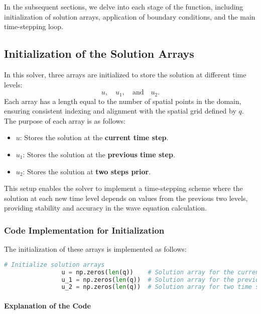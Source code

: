 \documentclass{article}
\begin{document}
		In the subsequent sections, we delve into each stage of the function, including initialization of solution arrays, application of boundary conditions, and the main time-stepping loop.
		
		
		\subsection{Initialization of the Solution Arrays}
		
			In this solver, three arrays are initialized to store the solution at different time levels:
			\[
			u, \quad u_1, \quad \text{and} \quad u_2.
			\]
			Each array has a length equal to the number of spatial points in the domain, ensuring consistent indexing and alignment with the spatial grid defined by \( q \). The purpose of each array is as follows:
			\begin{itemize}
				\item \( u \): Stores the solution at the \textbf{current time step}.
				\item \( u_1 \): Stores the solution at the \textbf{previous time step}.
				\item \( u_2 \): Stores the solution at \textbf{two steps prior}.
			\end{itemize}
			
			This setup enables the solver to implement a time-stepping scheme where the solution at each new time level depends on values from the previous two levels, providing stability and accuracy in the wave equation calculation.
			
			\subsubsection{Code Implementation for Initialization}
			
			The initialization of these arrays is implemented as follows:
			
			\begin{lstlisting}[language=Python]
				# Initialize solution arrays
				u = np.zeros(len(q))    # Solution array for the current time step
				u_1 = np.zeros(len(q))  # Solution array for the previous time step
				u_2 = np.zeros(len(q))  # Solution array for two time steps prior
			\end{lstlisting}
			
			\paragraph{Explanation of the Code}
			
\end{document}

